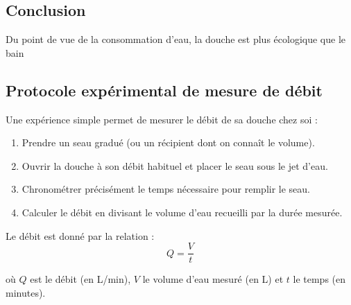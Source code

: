 \documentclass[a4paper,12pt]{article}
\begin{document}
\subsection*{Conclusion}

Du point de vue de la consommation d'eau, la douche est plus écologique que le bain

\subsection*{Protocole expérimental de mesure de débit}

Une expérience simple permet de mesurer le débit de sa douche chez soi :
\begin{enumerate}[noitemsep]
    \item Prendre un seau gradué (ou un récipient dont on connaît le volume).
    \item Ouvrir la douche à son débit habituel et placer le seau sous le jet d'eau.
    \item Chronométrer précisément le temps nécessaire pour remplir le seau.
    \item Calculer le débit en divisant le volume d'eau recueilli par la durée mesurée.
\end{enumerate}

Le débit est donné par la relation :
\begin{equation}
    Q = \frac{V}{t}
\end{equation}

où $Q$ est le débit (en L/min), $V$ le volume d'eau mesuré (en L) et $t$ le temps (en minutes).
\end{document}
